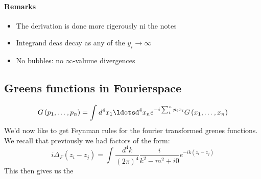 \documentclass{report}
\begin{document}
\paragraph{Remarks}
\begin{itemize}
  \item The derivation is done more rigerously ni the notes
  \item Integrand deas decay as any of the $y_i \to \infty$
  \item No bubbles: no $\infty$-valume divergences
\end{itemize}
\subsection{Greens functions in Fourierspace}
\[
G\left( p_1, \ldots,p_n \right) = \int_{}^{} d^{4} x_1\ldotsd^{4} x_n e^{-i \sum_{i}^{n} p_i x_i }  G\left( x_1,\ldots,x_n \right)  
\] 
We'd now like to get Feynman rules for the fourier transformed grenes functions. We recall that previously we had factors of the form: \[
i\Delta_F\left( z_i - z_j \right) = \int_{}^{} \frac{d^{4} k}{\left( 2\pi \right) ^{4} } \frac{i}{k^2 - m^2 + i 0} e^{-ik \left( z_i - z_j \right) }  
\] 
This then gives us the
\end{document}
